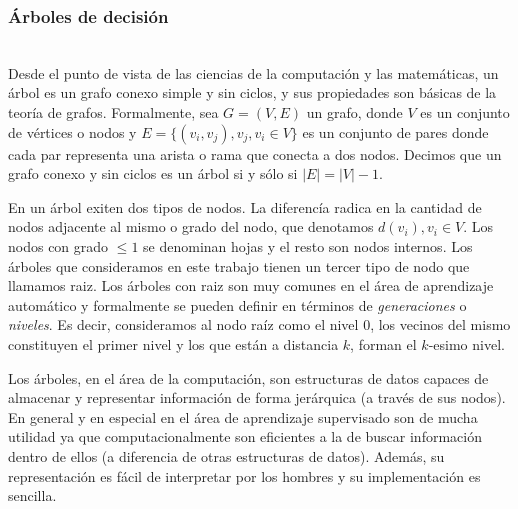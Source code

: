 \subsubsection{Árboles de decisión} ~\\

	Desde el punto de vista de las ciencias de la computación y las matemáticas, un árbol es un grafo conexo simple y sin ciclos, y sus propiedades son básicas de la teoría de grafos. Formalmente, sea $G=(V,E)$ un grafo, donde $V$ es un conjunto de vértices o nodos y $E=\{ (v_i, v_j), v_j,v_i \in V \}$ es un conjunto de pares donde cada par representa una arista o rama que conecta a dos nodos. Decimos que un grafo conexo y sin ciclos es un árbol si y sólo si $|E| = |V| - 1$. 
	
	
	En un árbol exiten dos tipos de nodos. La diferencía radica en la cantidad de nodos adjacente al mismo o grado del nodo, que denotamos $d(v_i), v_i \in V$. Los nodos con grado $\leq 1$ se denominan hojas y el resto son nodos internos. Los árboles que consideramos en este trabajo tienen un tercer tipo de nodo que llamamos raiz. Los árboles con raiz son muy comunes en el área de aprendizaje automático y formalmente se pueden definir en términos de \textit{generaciones} o \textit{niveles}. Es decir, consideramos al nodo raíz como el nivel 0, los vecinos del mismo constituyen el primer nivel y los que están a distancia $k$, forman el $k$-esimo nivel.
	
	Los árboles, en el área de la computación, son estructuras de datos capaces de almacenar y representar información de forma jerárquica (a través de sus nodos). En general y en especial en el área de aprendizaje supervisado son de mucha utilidad ya que computacionalmente son eficientes a la de buscar información dentro de ellos (a diferencia de otras estructuras de datos). Además, su representación es fácil de interpretar por los hombres y su implementación es sencilla.

